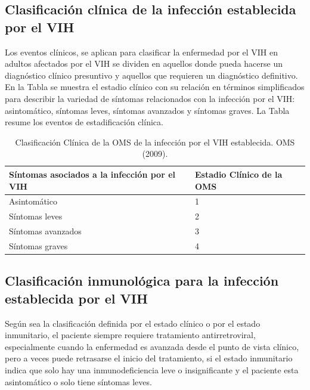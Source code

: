 \subsection{Clasificaci\'on cl\'inica de la infecci\'on establecida por el VIH }

	Los eventos cl\'inicos, se aplican para clasificar la enfermedad por el VIH en adultos afectados por el VIH se dividen en aquellos donde pueda hacerse un diagn\'ostico cl\'inico presuntivo y aquellos que requieren un diagn\'ostico definitivo. En la Tabla se muestra el estadio cl\'inico con su relaci\'on en t\'erminos simplificados para describir la variedad de s\'intomas relacionados con la infecci\'on por el VIH: asintom\'atico, s\'intomas leves, s\'intomas avanzados y s\'intomas graves. La Tabla resume los eventos de estadificaci\'on cl\'inica. \citet{oms} 
	
\begin{table}[H]	
\begin{center}
\begin{tabular}{|l|l|}
\hline
S\'intomas asociados a la infecci\'on por el VIH & Estadio Cl\'inico de la OMS \\ \hline
Asintom\'atico & 1  \\ \hline
S\'intomas leves & 2  \\ \hline
S\'intomas avanzados & 3  \\ \hline
S\'intomas graves & 4  \\ \hline

\end{tabular}
\caption{Clasificaci\'on Cl\'inica  de la OMS de la infecci\'on por el VIH establecida. OMS (2009).}
\label{tabla:estadios}
\end{center}
\end{table}

\subsection{Clasificaci\'on inmunol\'ogica para la infecci\'on establecida por el VIH}

	Seg\'un sea la clasificaci\'on definida por el estado cl\'inico o por el estado inmunitario, el paciente siempre requiere tratamiento antirretroviral, especialmente cuando la enfermedad es avanzada desde el punto de vista cl\'inico, pero a veces puede retrasarse el inicio del tratamiento, si el estado inmunitario indica que solo hay una inmunodeficiencia leve o insignificante y el paciente esta asintom\'atico o solo tiene s\'intomas leves. \citet{oms} 
	
